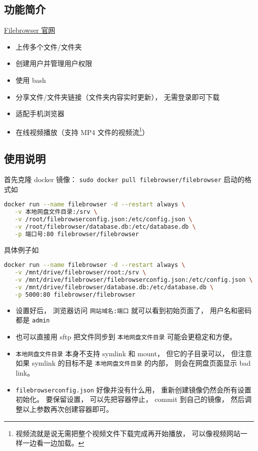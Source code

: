 
\subsection{功能简介}

\href{https://filebrowser.org/}{Filebrowser 官网}

\begin{itemize}
\item 上传多个文件/文件夹
\item 创建用户并管理用户权限
\item 使用 bash
\item 分享文件/文件夹链接（文件夹内容实时更新）， 无需登录即可下载
\item 适配手机浏览器
\item 在线视频播放（支持 MP4 文件的视频流\footnote{视频流就是说无需把整个视频文件下载完成再开始播放， 可以像视频网站一样一边看一边加载。}）
\end{itemize}

\subsection{使用说明}

首先克隆 docker 镜像： \verb|sudo docker pull filebrowser/filebrowser|
启动的格式如
\begin{lstlisting}[language=bash]
docker run --name filebrowser -d --restart always \
   -v 本地网盘文件目录:/srv \
   -v /root/filebrowserconfig.json:/etc/config.json \
   -v /root/filebrowser/database.db:/etc/database.db \
   -p 端口号:80 filebrowser/filebrowser
\end{lstlisting}
具体例子如 %
\begin{lstlisting}[language=bash]
docker run --name filebrowser -d --restart always \
   -v /mnt/drive/filebrowser/root:/srv \
   -v /mnt/drive/filebrowser/filebrowserconfig.json:/etc/config.json \
   -v /mnt/drive/filebrowser/database.db:/etc/database.db \
   -p 5000:80 filebrowser/filebrowser
\end{lstlisting}

\begin{itemize}
\item 设置好后， 浏览器访问 \verb`网站域名:端口` 就可以看到初始页面了， 用户名和密码都是 \verb`admin`
\item 也可以直接用 sftp 把文件同步到 \verb`本地网盘文件目录` 可能会更稳定和方便。
\item \verb`本地网盘文件目录` 本身不支持 symlink 和 mount， 但它的子目录可以， 但注意如果 symlink 的目标不是 \verb|本地网盘文件目录| 的内部， 则会在网盘页面显示 bad link。
\item \verb|filebrowserconfig.json| 好像并没有什么用， 重新创建镜像仍然会所有设置初始化。 要保留设置， 可以先把容器停止， commit 到自己的镜像， 然后调整以上参数再次创建容器即可。
\end{itemize}

